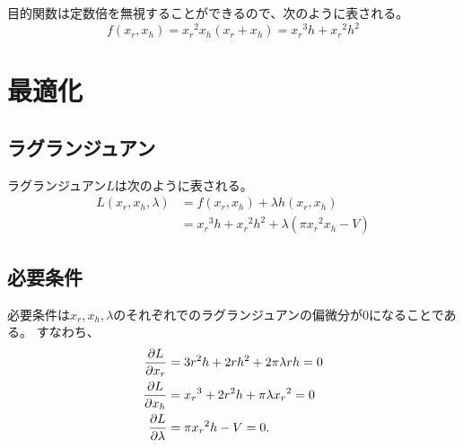 \documentclass{jsarticle}
\begin{document}
目的関数は定数倍を無視することができるので、次のように表される。
\begin{equation}
  f({x_r}, {x_h}) = {x_r}^2 {x_h} ({x_r}+{x_h})
  = {x_r}^3h + {x_r}^2h^2
\end{equation}

\section{最適化}
\subsection{ラグランジュアン}
ラグランジュアン$L$は次のように表される。
\begin{align}
  L({x_r}, {x_h}, \lambda) &= f({x_r}, {x_h}) + \lambda h({x_r}, {x_h}) \\
                   &= {x_r}^3h + {x_r}^2h^2 + \lambda (\pi {x_r}^2 {x_h} - V)
\end{align}

\subsection{必要条件}
必要条件は${x_r}, {x_h}, \lambda$のそれぞれでのラグランジュアンの偏微分が$0$になることである。
すなわち、
\begin{align}
  \pdv{L}{{x_r}}&= 3r^2h + 2rh^2 + 2\pi\lambda rh
  =0 \label{eq:d-{x_r}} \\
  \pdv{L}{{x_h}}&= {x_r}^3 + 2r^2h + \pi\lambda {x_r}^2
  =0 \label{eq:d-h} \\ 
  \pdv{L}{\lambda}&= \pi {x_r}^2h-V
  =0.\label{eq:d-lambda}
\end{align}
\end{document}
